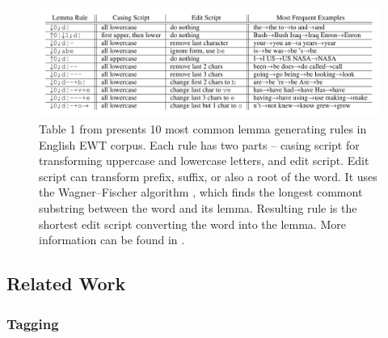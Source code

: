 \begin{figure}[H]
\centering
\includegraphics[width=1\textwidth]{../img/lemma_rules}
\protect\caption{
Table 1 from \citep{Straka2019b} presents 10 most common lemma generating rules in English EWT corpus. Each rule has two parts -- casing script for transforming uppercase and lowercase letters, and edit script. Edit script can transform prefix, suffix, or also a root of the word. It uses the Wagner–Fischer algorithm \citep{Wagner}, which finds the longest commont substring between the word and its lemma. Resulting rule is the shortest edit script converting the word into the lemma. More information can be found in \citep{Straka2019b}.
}
\label{fig:lemma_rules}
\end{figure}


\subsection{Related Work}
\subsubsection{Tagging}
